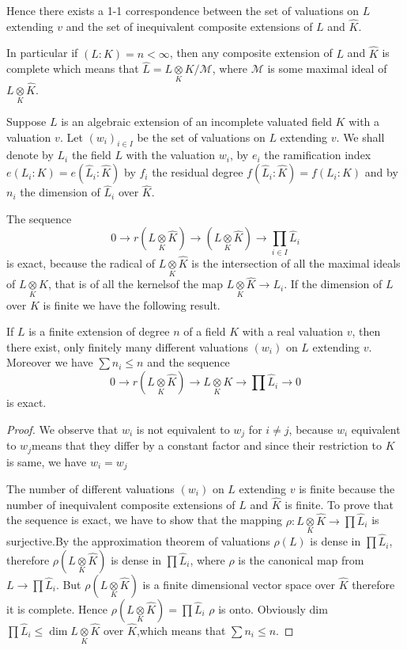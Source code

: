Hence there exists a 1-1 correspondence between the set of valuations
on $L$ extending $v$ and the set of inequivalent composite extensions
of $L$ and $\hat{K}$. 

In particular if $(L:  K)=n<\infty$, then any composite extension of
$L$ and $\hat{K}$ is complete which means that $\hat{L} =L
\underset{K}{\otimes} K/ \mathcal{M}$, where $\mathcal{M}$ is some
maximal ideal of $L \underset{K} \otimes \hat{K}$. 

Suppose $L$ is an algebraic extension of an incomplete valuated field
$K$ with a valuation $v$. Let $(w_i)_{i \in I}$ be the set of
valuations on $L$ extending $v$. We shall denote by $L_i$ the field
$L$ with the valuation $w_i$, by $e_i$ the ramification index $e(L_i
:K) =e(\hat{L}_i:  \hat{K})$ by $f_i$ the residual degree $f
(\hat{L}_i: \hat{K})=f (L_i: K)$ and by $n_i$ the dimension of
$\hat{L}_i$ over $\hat{K}$. 

The sequence
$$
0 \to r (L \underset{K} \otimes \hat{K}) \to (L \underset{K} \otimes
\hat{K}) \to \prod_{i \in I } \hat{L}_i 
$$
is exact, because the radical of $ L \underset{K} \otimes \hat{K}$ is
the intersection of all the maximal ideals of $L \underset{K} \otimes
\hat{K}$, that is of all the kernels\pageoriginale of the map $L \underset{K}
\otimes \hat{K} \to L_i$. If the dimension of $L$ over $K$ is finite
we have the following result. 

\begin{theorem}\label{part1:chap2:sec6:thm3}
  If $L$ is a finite extension of degree $n$ of a field $K$ with a
  real valuation $v$, then there exist, only finitely many different
  valuations $(w_i)$ on $L$ extending $v$. Moreover we have $\sum n_i
  \le n $ and the sequence 
  $$
  0 \to r (L \underset{K} \otimes \hat{K}) \to L \underset{K} \otimes
  K \to \prod \hat{L}_i \to 0 
  $$
  is exact.
\end{theorem}

\begin{proof}
  We observe that $w_i$ is not equivalent to $w_j$ for $i \neq j$,
  because $w_i$ equivalent to $w_j$means that they differ by a
  constant factor and since their restriction to $K$ is same, we have
  $w_i =w_j$ 

  The number of different valuations $(w_i)$ on $L$ extending $v$ is
  finite because the number of inequivalent composite extensions of $L$
  and $\hat{K}$ is finite. To prove that the sequence is exact, we have
  to show that the mapping $\rho:  L \underset{K} \otimes \hat{K} \to
  \prod \hat{L}_i$ 
  is surjective.By the approximation theorem of valuations $\rho (L)$ is
  dense in $\prod \hat{L}_i$, therefore $\rho(L \underset{K} \otimes
  \hat{K})$ is dense in $\prod \hat{L}_i$, where $\rho$ is the canonical
  map from $L \to \prod \hat {L}_i$. But $\rho ( L \underset{K} \otimes
  \hat{K})$ is a finite dimensional vector space over $\hat{K}$
  therefore it is complete. Hence $\rho ( L \underset{K} \otimes
  \hat{K}) = \prod \hat{L}_i$ \iec  $\rho$ is onto. Obviously dim $
  \prod \hat{L}_i \le \dim L \underset{K}\otimes \hat{K} $ over
  $\hat{K}$,which means that $\sum n_i \le n$. 
\end{proof}

